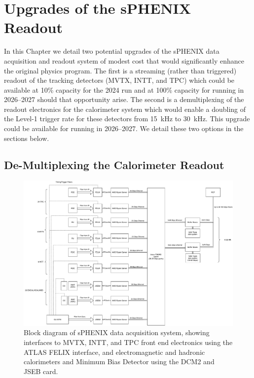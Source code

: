 \chapter{Upgrades of the sPHENIX Readout}
\label{chap:readout}

In this Chapter we detail two potential upgrades of the sPHENIX data
acquisition and readout system of modest cost that would significantly
enhance the original physics program.  The first is a streaming
(rather than triggered) readout of the tracking detectors (MVTX, INTT,
and TPC) which could be available at 10\% capacity for the 2024 run
and at 100\% capacity for running in 2026--2027 should that
opportunity arise.  The second is a demultiplexing of the readout
electronics for the calorimeter system which would enable a doubling
of the Level-1 trigger rate for these detectors from 15~kHz to 30~kHz.
This upgrade could be available for running in 2026--2027.  We detail
these two options in the sections below.



\section{De-Multiplexing the Calorimeter Readout}
\label{sec:streaming_readout}

\begin{figure}
    \centering
    \includegraphics[width=0.96\linewidth]{figs/sphenixdaq_servers_20200803.pdf}
    \caption{Block diagram of sPHENIX data acquisition system, showing
      interfaces to MVTX, INTT, and TPC front end electronics using
      the ATLAS FELIX interface, and electromagnetic and hadronic
      calorimeters and Minimum Bias Detector using the DCM2 and JSEB
      card.} 
    \label{fig:sphenixdaq_servers}
\end{figure}

